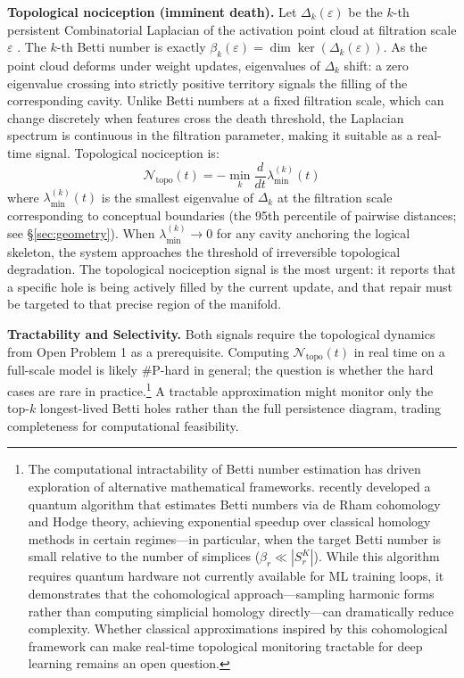\documentclass{article}
\begin{document}
\bigskip
\noindent\textbf{Topological nociception (imminent death).} Let $\Delta_k(\varepsilon)$ be the $k$-th persistent Combinatorial Laplacian of the activation point cloud at filtration scale $\varepsilon$ \citep{Memoli2022persistent}. The $k$-th Betti number is exactly $\beta_k(\varepsilon) = \dim \ker(\Delta_k(\varepsilon))$. As the point cloud deforms under weight updates, eigenvalues of $\Delta_k$ shift: a zero eigenvalue crossing into strictly positive territory signals the filling of the corresponding cavity. Unlike Betti numbers at a fixed filtration scale, which can change discretely when features cross the death threshold, the Laplacian spectrum is continuous in the filtration parameter, making it suitable as a real-time signal. Topological nociception is:
\begin{equation}
\mathcal{N}_{\text{topo}}(t) = -\min_k \frac{d}{dt}\lambda_{\min}^{(k)}(t)
\end{equation}
where $\lambda_{\min}^{(k)}(t)$ is the smallest eigenvalue of $\Delta_k$ at the filtration scale corresponding to conceptual boundaries (the 95th percentile of pairwise distances; see \S\ref{sec:geometry}). When $\lambda_{\min}^{(k)} \to 0$ for any cavity anchoring the logical skeleton, the system approaches the threshold of irreversible topological degradation. The topological nociception signal is the most urgent: it reports that a specific hole is being actively filled by the current update, and that repair must be targeted to that precise region of the manifold.

\bigskip
\noindent\textbf{Tractability and Selectivity.} Both signals require the topological dynamics from Open Problem 1 as a prerequisite. Computing $\mathcal{N}_{\text{topo}}(t)$ in real time on a full-scale model is likely \#P-hard in general; the question is whether the hard cases are rare in practice.\footnote{The computational intractability of Betti number estimation has driven exploration of alternative mathematical frameworks. \citet{Nghiem2025quantum} recently developed a quantum algorithm that estimates Betti numbers via de Rham cohomology and Hodge theory, achieving exponential speedup over classical homology methods in certain regimes---in particular, when the target Betti number is small relative to the number of simplices ($\beta_r \ll |S_r^K|$). While this algorithm requires quantum hardware not currently available for ML training loops, it demonstrates that the cohomological approach---sampling harmonic forms rather than computing simplicial homology directly---can dramatically reduce complexity. Whether classical approximations inspired by this cohomological framework can make real-time topological monitoring tractable for deep learning remains an open question.} A tractable approximation might monitor only the top-$k$ longest-lived Betti holes rather than the full persistence diagram, trading completeness for computational feasibility.
\end{document}
